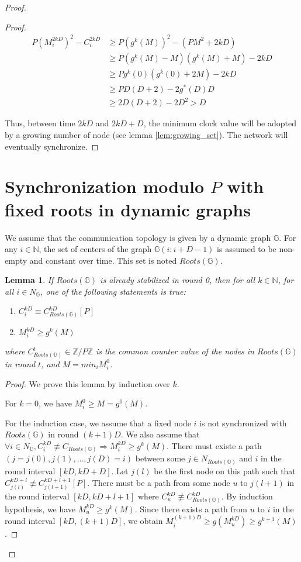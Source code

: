 \documentclass[11pt,letterpaper]{article}
\newtheorem{lem}[thm]{Lemma}
\begin{document}
\begin{proof}
\begin{proof}
	\begin{align*}
		P(M_i^{2kD})^2 - C_i^{2kD} & \geq P(g^k(M))^2-(PM^2+2kD) \\
		& \geq P(g^k(M)-M)(g^k(M)+M)-2kD \\
		& \geq Pg^k(0)(g^k(0)+2M)-2kD \\
		& \geq PD(D+2)-2g^*(D)D \\
		& \geq 2D(D+2)-2D^2 > D
	\end{align*}

	Thus, between time $2kD$ and $2kD + D$,
	the minimum clock value will be adopted by a growing number of node (see lemma \ref{lem:growing_set}).
	The network will eventually synchronize.
\end{proof}

\section{Synchronization modulo $P$ with fixed roots in dynamic graphs}

We assume that the communication topology is given by a dynamic graph $\mathds{G}$.
For any $i \in \mathds{N}$, the set of centers of the graph $\mathds{G}(i:i+D-1)$ is assumed to be non-empty and constant over time.
This set is noted $Roots(\mathds{G})$.

\begin{lem} \label{lem:croissant}
	If $Roots(\mathds{G})$ is already stabilized in round 0, then
	for all $k \in \mathds{N}$, for all $i \in N_\mathds{G}$,
	one of the following statements is true:
	\begin{enumerate}
		\item $C_i^{kD} \equiv C_{Roots(\mathds{G})}^{kD} [P]$
		\item $M_i^{kD} \geq g^{k}(M)$
	\end{enumerate}
	where $C_{Roots(\mathds{G})}^t \in \mathds{Z}/P\mathds{Z}$ is the common counter value of the nodes in $Roots(\mathds{G})$ in round $t$, and $M = min_i M_i^0$.
\end{lem}
\begin{proof}
	We prove this lemma by induction over $k$.

	For $k = 0$, we have $M^0_i \geq M = g^0(M)$.

	For the induction case, we assume that a fixed node $i$ is not synchronized with $Roots(\mathds{G})$ in round $(k+1)D$.
	We also assume that $\forall i \in N_\mathds{G}, C_i^{kD} \not\equiv C_{Roots(\mathds{G})} \Rightarrow M_i^{kD} \geq g^{k}(M)$.
	There must existe a path $(j = j(0), j(1), \dots, j(D) = i)$ between some $j \in N_{Roots(\mathds{G})}$ and $i$ in the round interval $[kD, kD+D]$.
	Let $j(l)$ be the first node on this path such that $C_{j(l)}^{kD+l} \not\equiv C_{j(l+1)}^{kD+l+1} [P]$.
	There must be a path from some node $u$ to $j(l+1)$ in the round interval $[kD, kD+l+1]$ where $C_u^{kD} \not\equiv C^{kD}_{Roots(\mathds{G})}$.
	By induction hypothesis, we have $M_u^{kD} \geq g^{k}(M)$.
	Since there exists a path from $u$ to $i$ in the round interval $[kD, (k+1)D]$,
	we obtain $M_i^{(k+1)D} \geq g(M_u^{kD}) \geq g^{k+1}(M)$.
\end{proof}


\end{proof}
\end{document}

